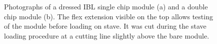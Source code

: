 
\begin{figure}
	\centering

  \caption{Photographs of a dressed IBL single chip module (a) and a double chip module (b). The flex extension visible on the top allows testing of the module before loading on stave. It was cut during the stave loading procedure at a cutting line slightly above the bare module.}
	\label{fig:module_pictures}
\end{figure}


